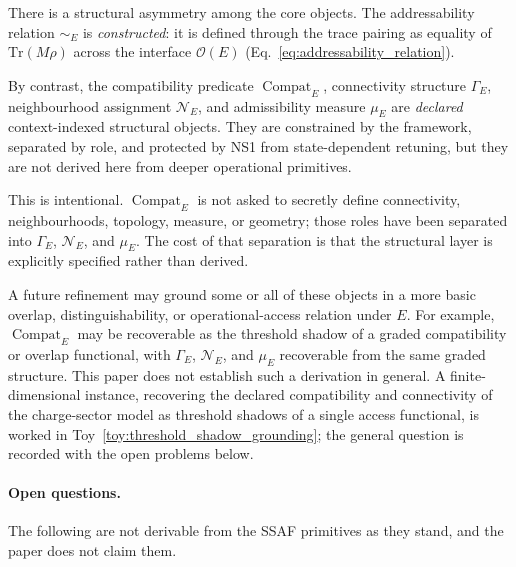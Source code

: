 \documentclass[aps,prx,onecolumn,11pt]{revtex4-2}
\theoremstyle{plain}
\theoremstyle{definition}
\theoremstyle{remark}
\newcommand{\Compat}{\operatorname{Compat}} %
\begin{document}
There is a structural asymmetry among the core objects. The
addressability relation \(\sim_E\) is \emph{constructed}: it is defined
through the trace pairing as equality of \(\mathrm{Tr}(M\rho)\) across
the interface \(\mathcal O(E)\)
(Eq.~\ref{eq:addressability_relation}).

By contrast, the compatibility predicate \(\Compat_E\), connectivity
structure \(\Gamma_E\), neighbourhood assignment \(\mathcal N_E\), and
admissibility measure \(\mu_E\) are \emph{declared} context-indexed
structural objects. They are constrained by the framework, separated by
role, and protected by NS1 from state-dependent retuning, but they are
not derived here from deeper operational primitives.

This is intentional. \(\Compat_E\) is not asked to secretly define
connectivity, neighbourhoods, topology, measure, or geometry; those
roles have been separated into \(\Gamma_E\), \(\mathcal N_E\), and
\(\mu_E\). The cost of that separation is that the structural layer is
explicitly specified rather than derived.

A future refinement may ground some or all of these objects in a more
basic overlap, distinguishability, or operational-access relation under
\(E\). For example, \(\Compat_E\) may be recoverable as the threshold
shadow of a graded compatibility or overlap functional, with
\(\Gamma_E\), \(\mathcal N_E\), and \(\mu_E\) recoverable from the same
graded structure. This paper does not establish such a derivation in
general. A finite-dimensional instance, recovering the declared
compatibility and connectivity of the charge-sector model as threshold
shadows of a single access functional, is worked in
Toy~\ref{toy:threshold_shadow_grounding}; the general question is
recorded with the open problems below.

\paragraph{Open questions.}

The following are not derivable from the SSAF primitives as they stand,
and the paper does not claim them.
\end{document}
